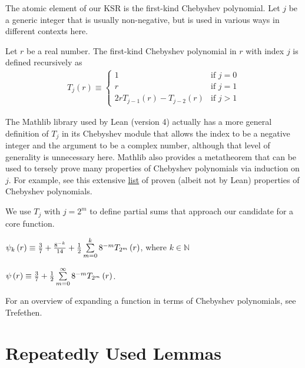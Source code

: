 The atomic element of our KSR is the first-kind Chebyshev polynomial. Let $j$ be a generic integer that is usually non-negative, but is used in various ways in different contexts here.
\begin{definition}
  \label{def:T}
  \leanok
  Let $r$ be a real number. The first-kind Chebyshev polynomial in $r$ with index $j$ is defined recursively as
  \begin{align*}
T_j\left(r\right) \equiv 
\begin{cases}
1 & \text{if } j = 0 \\
r & \text{if } j = 1 \\
2 r T_{j - 1}\left(r\right) - T_{j - 2}\left(r\right) & \text{if } j > 1
\end{cases}
  \end{align*}
\end{definition}
\noindent The Mathlib library used by Lean (version 4) actually has a more general definition of $T_j$ in its Chebyshev module that allows the index to be a negative integer and the argument to be a complex number, although that level of generality is unnecessary here. Mathlib also provides a metatheorem that can be used to tersely prove many properties of Chebyshev polynomials via induction on $j$. For example, see this extensive \href{https://fungrim.org/topic/Chebyshev_polynomials/}{list} of proven (albeit not by Lean) properties of Chebyshev polynomials.

We use $T_j$ with $j = 2^m$ to define partial sums that approach our candidate for a core function.
\begin{definition}
  \label{def:approx}
  \leanok
  $\psi_k\left(r\right) \equiv \frac{3}{7} + \frac{8^{-k}}{14} + \frac{1}{2} \sum\limits_{m = 0}^{k} 8^{-m} T_{2^{m}}\left(r\right)$, where $k \in \mathbb{N}$
\end{definition}
\begin{definition}
  \label{def:core}
  \leanok
  $\psi\left(r\right) \equiv \frac{3}{7} + \frac{1}{2} \sum\limits_{m = 0}^{\infty} 8^{-m} T_{2^{m}}\left(r\right)$.
\end{definition}
\noindent For an overview of expanding a function in terms of Chebyshev polynomials, see Trefethen.

\section{Repeatedly Used Lemmas}\label{sec:RepeatedlyUsedLemmas}


